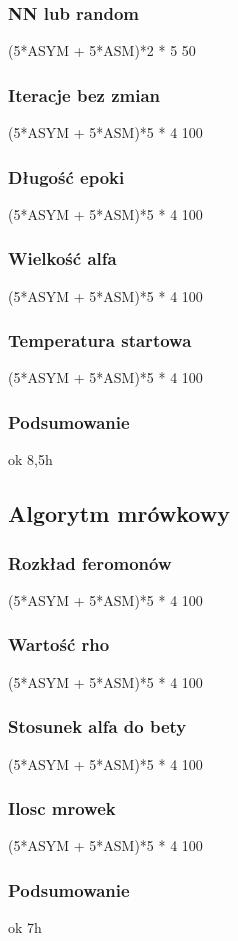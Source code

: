 \documentclass{article}
\begin{document}
      \subsubsection{NN lub random}
        (5*ASYM + 5*ASM)*2 * 5 50
      \subsubsection{Iteracje bez zmian}
        (5*ASYM + 5*ASM)*5 * 4 100
      \subsubsection{Długość epoki}
        (5*ASYM + 5*ASM)*5 * 4 100
      \subsubsection{Wielkość alfa}
        (5*ASYM + 5*ASM)*5 * 4 100
      \subsubsection{Temperatura startowa}
        (5*ASYM + 5*ASM)*5 * 4 100
      \subsubsection{Podsumowanie}ok 8,5h
    \subsection{Algorytm mrówkowy}
      \subsubsection{Rozkład feromonów}
        (5*ASYM + 5*ASM)*5 * 4 100
      \subsubsection{Wartość rho}
        (5*ASYM + 5*ASM)*5 * 4 100
      \subsubsection{Stosunek alfa do bety}
        (5*ASYM + 5*ASM)*5 * 4 100
      \subsubsection{Ilosc mrowek}
        (5*ASYM + 5*ASM)*5 * 4 100
      \subsubsection{Podsumowanie}ok 7h
\end{document}
